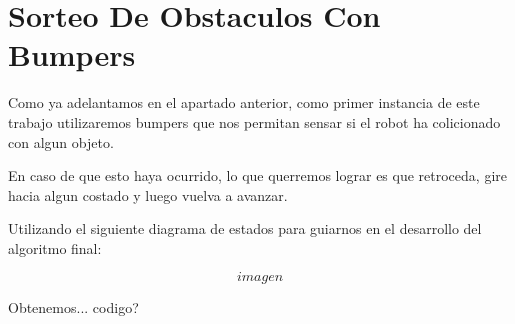 \section{Sorteo De Obstaculos Con Bumpers}

Como ya adelantamos en el apartado anterior, como primer instancia de este trabajo utilizaremos bumpers que nos permitan sensar si el robot ha colicionado con algun objeto. 

En caso de que esto haya ocurrido, lo que querremos lograr es que retroceda, gire hacia algun costado y luego vuelva a avanzar.

Utilizando el siguiente diagrama de estados para guiarnos en el desarrollo del algoritmo final:

$$imagen$$

Obtenemos... codigo?